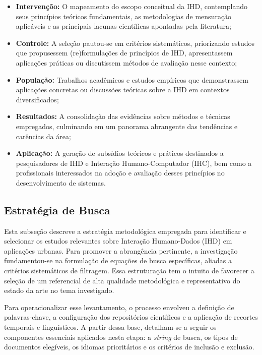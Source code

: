 \documentclass[
	12pt,				%
	oneside,			%
	a4paper,			%
	english,			%
	brazil				%
	]{abntex2ppgsi}
\begin{document}
\begin{itemize}
    \item[]\textbf{Intervenção:} O mapeamento do escopo conceitual da IHD, contemplando seus princípios teóricos fundamentais, as metodologias de mensuração aplicáveis e as principais lacunas científicas apontadas pela literatura;
    \item[] \textbf{Controle:} A seleção pautou-se em critérios sistemáticos, priorizando estudos que propusessem (re)formulações de princípios de IHD, apresentassem aplicações práticas ou discutissem métodos de avaliação nesse contexto;
    \item[] \textbf{População:} Trabalhos acadêmicos e estudos empíricos que demonstrassem aplicações concretas ou discussões teóricas sobre a IHD em contextos diversificados;
    \item[] \textbf{Resultados:} A consolidação das evidências sobre métodos e técnicas empregados, culminando em um panorama abrangente das tendências e carências da área;
    \item[] \textbf{Aplicação:} A geração de subsídios teóricos e práticos destinados a pesquisadores de IHD e Interação Humano-Computador (IHC), bem como a profissionais interessados na adoção e avaliação desses princípios no desenvolvimento de sistemas.
\end{itemize}

    \subsection{Estratégia de Busca}
    \label{estrategiaDeBusca}

    Esta subseção descreve a estratégia metodológica empregada para identificar e selecionar os estudos relevantes sobre Interação Humano-Dados (IHD) em aplicações urbanas. Para promover a abrangência pertinente, a investigação fundamentou-se na formulação de equações de busca específicas, aliadas a critérios sistemáticos de filtragem. Essa estruturação tem o intuito de favorecer a seleção de um referencial de alta qualidade metodológica e representativo do estado da arte no tema investigado.

    Para operacionalizar esse levantamento, o processo envolveu a definição de palavras-chave, a configuração dos repositórios científicos e a aplicação de recortes temporais e linguísticos. A partir dessa base, detalham-se a seguir os componentes essenciais aplicados nesta etapa: a \textit{string} de busca, os tipos de documentos elegíveis, os idiomas prioritários e os critérios de inclusão e exclusão.
\end{document}
